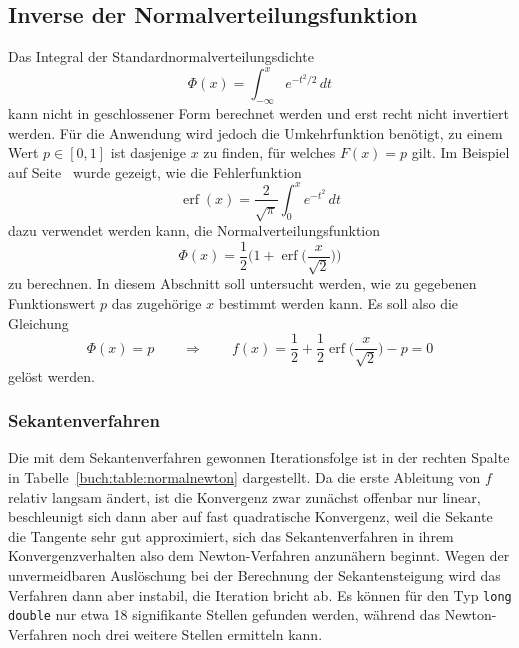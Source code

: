 %
%
%
\subsection{Inverse der Normalverteilungsfunktion
\label{buch:subsection:inversenormal}}
Das Integral der Standardnormalverteilungsdichte
%
%
\[
\Phi(x) = \int_{-\infty}^x e^{-t^2/2}\,dt
\]
kann nicht in geschlossener Form berechnet werden und erst recht
nicht invertiert werden.
Für die Anwendung wird jedoch die Umkehrfunktion benötigt, zu einem Wert
$p\in[0,1]$ ist dasjenige $x$ zu finden, für welches $F(x)=p$ gilt.
%
Im Beispiel auf Seite~\pageref{buch:beispiel:erfc} wurde gezeigt,
wie die Fehlerfunktion
%
%
\[
\operatorname{erf}(x) = \frac{2}{\sqrt{\pi}}\int_0^x e^{-t^2}\,dt
\]
dazu verwendet werden kann, die Normalverteilungsfunktion
%
%
\[
\Phi(x)
=
\frac12\biggl(1+\operatorname{erf}\biggl(\frac{x}{\sqrt{2}}\biggr)\biggr)
\]
zu berechnen.
In diesem Abschnitt soll untersucht werden, wie zu gegebenen Funktionswert
$p$ das zugehörige $x$ bestimmt werden kann.
Es soll also die Gleichung
\[
\Phi(x)=p
\qquad\Rightarrow\qquad
f(x)=\frac12+\frac12\operatorname{erf}\biggl(\frac{x}{\sqrt{2}}\biggr)-p=0
\]
gelöst werden.

\subsubsection{Sekantenverfahren}
%
Die mit dem Sekantenverfahren gewonnen Iterationsfolge ist in der rechten
Spalte in Tabelle~\ref{buch:table:normalnewton} dargestellt.
Da die erste Ableitung von $f$ relativ langsam ändert, ist die Konvergenz
zwar zunächst offenbar nur linear, beschleunigt sich dann aber auf fast
quadratische Konvergenz, weil die Sekante die Tangente sehr gut approximiert,
sich das Sekantenverfahren in ihrem Konvergenzverhalten also dem
Newton-Verfahren anzunähern beginnt.
%
%
Wegen der unvermeidbaren Auslöschung bei der Berechnung der Sekantensteigung
wird das Verfahren dann aber instabil, die Iteration bricht ab.
%
Es können für den Typ \texttt{long double} nur etwa 18 signifikante
Stellen gefunden werden, während das Newton-Verfahren noch drei weitere
Stellen ermitteln kann.
%
%

